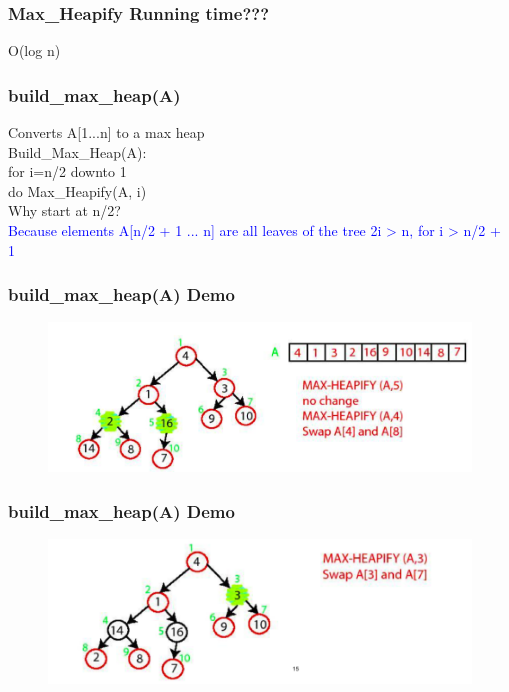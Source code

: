 \documentclass[11pt]{beamer}
\begin{document}
\begin{frame}
	\frametitle	{Max\_Heapify Running time???} 
	\pause O(log n)
\end{frame}

\begin{frame}
	\frametitle	{build\_max\_heap(A)} 
	
	Converts A[1...n] to a max heap\\
	Build\_Max\_Heap(A):\\ for i=n/2 downto 1\\
	do Max\_Heapify(A, i)\\
	\pause \alert{Why start at n/2?}\\
	\pause \textcolor{blue}{Because elements A[n/2 + 1 ... n] are all leaves of the tree 2i > n, for i > n/2 + 1}
\end{frame}

\begin{frame}
	\frametitle	{build\_max\_heap(A) Demo} 
	\begin{figure}
		\centering
		\includegraphics[width=1\linewidth]{"Screenshot 2020-12-23 at 9.29.55 PM"}
		\label{fig:screenshot-2020-12-23-at-9}
	\end{figure}
	
\end{frame}

\begin{frame}
	\frametitle	{build\_max\_heap(A) Demo} 
	\begin{figure}
		\centering
		\includegraphics[width=1\linewidth]{"Screenshot 2020-12-23 at 9.30.04 PM"}
		\label{fig:screenshot-2020-12-23-at-9}
	\end{figure}
	
\end{frame}
\end{document}
